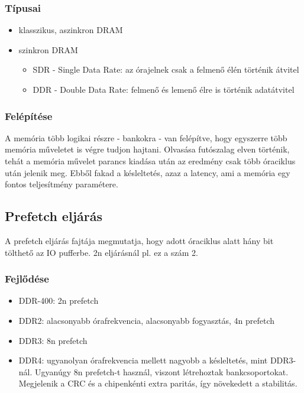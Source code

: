 \subsubsection{Típusai}
\begin{itemize}
    \item klasszikus, aszinkron DRAM
    \item szinkron DRAM
    \begin{itemize}
        \item SDR - Single Data Rate: az órajelnek csak a felmenő élén történik átvitel
        \item DDR - Double Data Rate: felmenő és lemenő élre is történik adatátvitel
    \end{itemize}
\end{itemize}

\subsubsection{Felépítése}
A memória több logikai részre - bankokra - van felépítve, hogy egyszerre több memória műveletet is végre tudjon hajtani.
Olvasása futószalag elven történik, tehát a memória művelet parancs kiadása után az eredmény csak több óraciklus után jelenik meg.
Ebből fakad a késleltetés, azaz a latency, ami a memória egy fontos teljesítmény paramétere.

\subsection{Prefetch eljárás}
A prefetch eljárás fajtája megmutatja, hogy adott óraciklus alatt hány bit tölthető az IO pufferbe.
2n eljárásnál pl. ez a szám 2.

\subsubsection{Fejlődése}
\begin{itemize}
    \item DDR-400: 2n prefetch
    \item DDR2: alacsonyabb órafrekvencia, alacsonyabb fogyasztás, 4n prefetch
    \item DDR3: 8n prefetch
    \item DDR4: ugyanolyan órafrekvencia mellett nagyobb a késleltetés, mint DDR3-nál. Ugyanúgy 8n prefetch-t használ, viszont létrehoztak bankcsoportokat. Megjelenik a CRC és a chipenkénti extra paritás, így növekedett a stabilitás.
\end{itemize}

